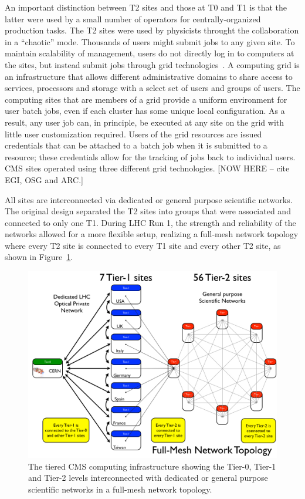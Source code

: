 An important distinction between T2 sites and those at T0 and T1 is that
the latter were used by a small number of operators for centrally-organized
production tasks.  The T2 sites were used by physicists throught the
collaboration in a ``chaotic'' mode.  Thousands of users might submit jobs
to any given site.  To maintain scalability of management, users do not
directly log in to computers at the sites, but instead submit jobs through
grid technologies~\cite{thegrid}.  A computing grid is an infrastructure
that allows different administrative domains to share access to services,
processors and storage with a select set of users and groups of users. The
computing sites that are members of a grid provide a uniform environment
for user batch jobs, even if each cluster has some unique local
configuration.  As a result, any user job can, in principle, be executed at
any site on the grid with little user customization required.  Users of the
grid resources are issued credentials that can be attached to a batch job
when it is submitted to a resource; these credentials allow for the
tracking of jobs back to individual users.  CMS sites operated using three
different grid technologies.  [NOW HERE -- cite EGI, OSG and ARC.]

All sites are interconnected via
dedicated or general purpose scientific networks. The original design
separated the T2 sites into groups that were associated and connected
to only one T1. During LHC Run 1, the strength and reliability of the
networks allowed for a more flexible setup, realizing a full-mesh network
topology where every T2 site is connected to every T1 site and
every other T2 site, as shown in Figure~\ref{fig:distributed_topology}.

\begin{figure}
\begin{center}
\includegraphics[width=.5\textwidth]{figs/distributed_topology}
\end{center}
\caption{The tiered CMS computing infrastructure showing the Tier-0, Tier-1 and Tier-2 levels interconnected with dedicated or general purpose scientific networks in a full-mesh network topology.
  \label{fig:distributed_topology}}
\end{figure}

